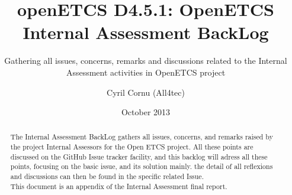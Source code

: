\documentclass{template/openetcs_article}
\begin{document}
\frontmatter
{}




\title{openETCS D4.5.1: OpenETCS Internal Assessment BackLog}

\subtitle{Gathering all issues, concerns, remarks and discussions related to the Internal Assessment activities in OpenETCS project}

\date{October 2013}

\author{Cyril Cornu (All4tec)}






\begin{abstract}
The Internal Assessment BackLog gathers all issues, concerns, and remarks raised by the project Internal Assessors for the Open ETCS project. All these points are discussed on the GitHub Issue tracker facility, and this backlog will adress all these points, focusing on the basic issue, and its solution mainly. the detail of all reflexions and discussions can then be found in the specific related Issue.\\
This document is an appendix of the Internal Assessment final report.
\end{abstract}

\maketitle
\setcounter{tocdepth}{2}
\tableofcontents
\newpage


\end{document}
